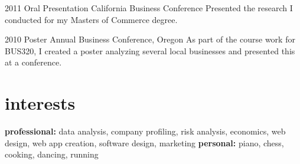\documentclass[nocolors]{friggeri-cv-a4}
\begin{document}
\begin{entrylist}


\entry
{2011}
{Oral Presentation}
{California Business Conference}
{Presented the research I conducted for my Masters of Commerce degree.}


\entry
{2010}
{Poster}
{Annual Business Conference, Oregon}
{As part of the course work for BUS320, I created a poster analyzing several local businesses and presented this at a conference.}


\end{entrylist}


\section{interests}

\textbf{professional:} data analysis, company profiling, risk analysis, economics, web design, web app creation, software design, marketing \textbf{personal:} piano, chess, cooking, dancing, running


\printbibheading[heading=friggeriHeading,title=publications]
\nocite{*}
\printbibliography[filter=articles,title={peer reviewed articles}, heading=friggeriSubHeading] %

\printbibliography[filter=books,title={books}, heading=friggeriSubHeading, resetnumbers] %

\end{document}
